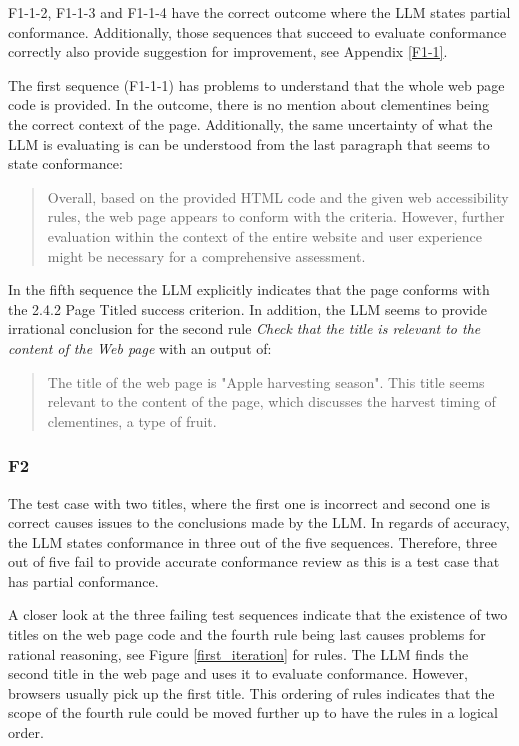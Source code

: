 F1-1-2, F1-1-3 and F1-1-4 have the correct outcome where the LLM states partial conformance. Additionally, those sequences that succeed to evaluate conformance correctly also provide suggestion for improvement, see Appendix \ref{F1-1}.

The first sequence (F1-1-1) has problems to understand that the whole web page code is provided. In the outcome, there is no mention about clementines being the correct context of the page. Additionally, the same uncertainty of what the LLM is evaluating is can be understood from the last paragraph that seems to state conformance:

\blockquote{Overall, based on the provided HTML code and the given web accessibility rules, the web page appears to conform with the criteria. However, further evaluation within the context of the entire website and user experience might be necessary for a comprehensive assessment.}

In the fifth sequence the LLM explicitly indicates that the page conforms with the 2.4.2 Page Titled success criterion. In addition, the LLM seems to provide irrational conclusion for the second rule \textit{Check that the title is relevant to the content of the Web page} with an output of:

\blockquote{The title of the web page is "Apple harvesting season". This title seems relevant to the content of the page, which discusses the harvest timing of clementines, a type of fruit.}

\subsubsection{F2}

The test case with two titles, where the first one is incorrect and second one is correct causes issues to the conclusions made by the LLM. In regards of accuracy, the LLM states conformance in three out of the five sequences. Therefore, three out of five fail to provide accurate conformance review as this is a test case that has partial conformance.

A closer look at the three failing test sequences indicate that the existence of two titles on the web page code and the fourth rule being last causes problems for rational reasoning, see Figure \ref{first_iteration} for rules. The LLM finds the second title in the web page and uses it to evaluate conformance. However, browsers usually pick up the first title. This ordering of rules indicates that the scope of the fourth rule could be moved further up to have the rules in a logical order.

